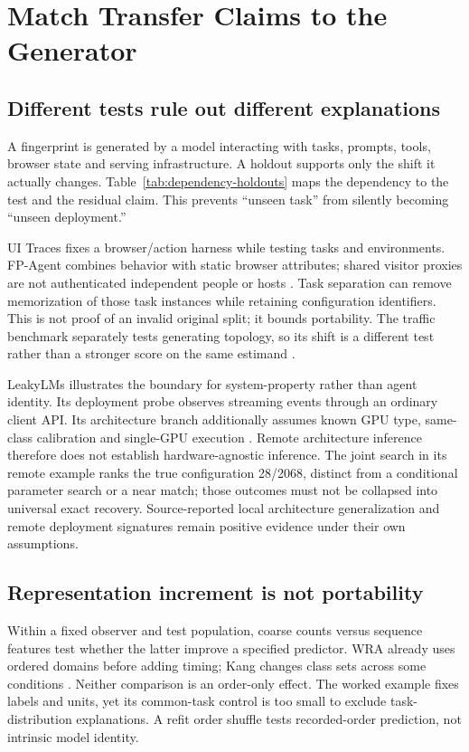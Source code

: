 \section{Match Transfer Claims to the Generator}\label{sec:evaluation}\label{sec:threats}
\subsection{Different tests rule out different explanations}
A fingerprint is generated by a model interacting with tasks, prompts, tools, browser state and serving infrastructure. A holdout supports only the shift it actually changes. Table~\ref{tab:dependency-holdouts} maps the dependency to the test and the residual claim. This prevents ``unseen task'' from silently becoming ``unseen deployment.''

UI Traces fixes a browser/action harness while testing tasks and environments. FP-Agent combines behavior with static browser attributes; shared visitor proxies are not authenticated independent people or hosts \cite{uitraces2026,wang2026fpagent}. Task separation can remove memorization of those task instances while retaining configuration identifiers. This is not proof of an invalid original split; it bounds portability. The traffic benchmark separately tests generating topology, so its shift is a different test rather than a stronger score on the same estimand \cite{pouryousef2026traffic}.

LeakyLMs illustrates the boundary for system-property rather than agent identity. Its deployment probe observes streaming events through an ordinary client API. Its architecture branch additionally assumes known GPU type, same-class calibration and single-GPU execution \cite{majidi2026leakylms}. Remote architecture inference therefore does not establish hardware-agnostic inference. The joint search in its remote example ranks the true configuration 28/2068, distinct from a conditional parameter search or a near match; those outcomes must not be collapsed into universal exact recovery. Source-reported local architecture generalization and remote deployment signatures remain positive evidence under their own assumptions.


\subsection{Representation increment is not portability}
Within a fixed observer and test population, coarse counts versus sequence features test whether the latter improve a specified predictor. WRA already uses ordered domains before adding timing; Kang changes class sets across some conditions \cite{jeong2026wra,kang2026whoseagent}. Neither comparison is an order-only effect. The worked example fixes labels and units, yet its common-task control is too small to exclude task-distribution explanations. A refit order shuffle tests recorded-order prediction, not intrinsic model identity.

